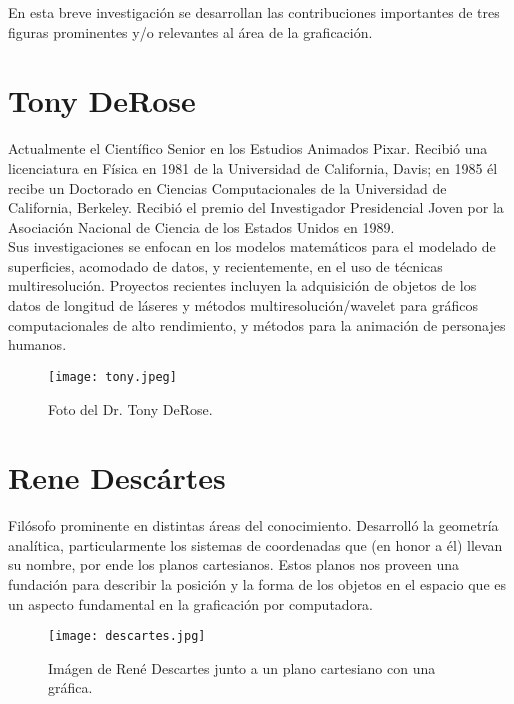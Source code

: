 \documentclass[letterpaper, 12pt]{article}
\begin{document}
    \newpage
    \begin{justify}
        \thispagestyle{empty}
        En esta breve investigación se desarrollan las contribuciones importantes de tres figuras prominentes y/o relevantes al área de la graficación.
        \section*{Tony DeRose}
        Actualmente el Científico Senior en los Estudios Animados Pixar. Recibió una licenciatura en Física en 1981 de la Universidad de California, Davis;
        en 1985 él recibe un Doctorado en Ciencias Computacionales de la Universidad de California, Berkeley. Recibió el premio del Investigador Presidencial Joven por la
        Asociación Nacional de Ciencia de los Estados Unidos en 1989.
        \\\newline
        Sus investigaciones se enfocan en los modelos matemáticos
        para el modelado de superficies, acomodado de datos, y recientemente, en el uso de técnicas multiresolución. Proyectos recientes incluyen la adquisición de objetos de 
        los datos de longitud de láseres y métodos multiresolución/wavelet para gráficos computacionales de alto rendimiento, y métodos para la animación de personajes humanos.
        \begin{figure}[H]
            \centering
            \texttt{[image: tony.jpeg]}
            \caption{Foto del Dr. Tony DeRose.} 
        \end{figure}
        \section*{Rene Descártes}
        Filósofo prominente en distintas áreas del conocimiento. Desarrolló la geometría analítica, particularmente los sistemas de coordenadas que (en honor a él) llevan su nombre, por ende los planos cartesianos. Estos planos nos proveen una fundación
        para describir la posición y la forma de los objetos en el espacio que es un aspecto fundamental en la graficación por computadora.
        \begin{figure}[H]
            \centering
            \texttt{[image: descartes.jpg]}
            \caption{Imágen  de René Descartes junto a un plano cartesiano con una gráfica.}
        \end{figure}

\end{justify}
\end{document}
